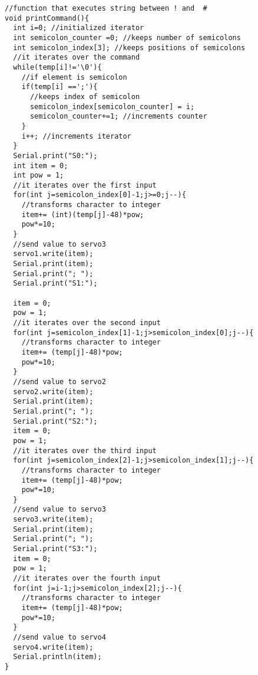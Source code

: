 \documentclass[pdftex,12pt,a4paper]{article}
\begin{document}
\begin{flushleft}
\begin{lstlisting}[language=Arduino]
//function that executes string between ! and  #
void printCommand(){
  int i=0; //initialized iterator
  int semicolon_counter =0; //keeps number of semicolons
  int semicolon_index[3]; //keeps positions of semicolons
  //it iterates over the command
  while(temp[i]!='\0'){
    //if element is semicolon
    if(temp[i] ==';'){
      //keeps index of semicolon
      semicolon_index[semicolon_counter] = i;
      semicolon_counter+=1; //increments counter
    }
    i++; //increments iterator
  }
  Serial.print("S0:");
  int item = 0; 
  int pow = 1;
  //it iterates over the first input
  for(int j=semicolon_index[0]-1;j>=0;j--){
    //transforms character to integer
    item+= (int)(temp[j]-48)*pow;
    pow*=10;
  }
  //send value to servo3
  servo1.write(item);
  Serial.print(item);
  Serial.print("; ");
  Serial.print("S1:");

  item = 0; 
  pow = 1;
  //it iterates over the second input
  for(int j=semicolon_index[1]-1;j>semicolon_index[0];j--){
    //transforms character to integer
    item+= (temp[j]-48)*pow;
    pow*=10;
  }
  //send value to servo2
  servo2.write(item);
  Serial.print(item);
  Serial.print("; ");
  Serial.print("S2:");
  item = 0; 
  pow = 1;
  //it iterates over the third input
  for(int j=semicolon_index[2]-1;j>semicolon_index[1];j--){
    //transforms character to integer
    item+= (temp[j]-48)*pow;
    pow*=10;
  }
  //send value to servo3
  servo3.write(item);
  Serial.print(item);
  Serial.print("; ");
  Serial.print("S3:");
  item = 0; 
  pow = 1;
  //it iterates over the fourth input
  for(int j=i-1;j>semicolon_index[2];j--){
    //transforms character to integer
    item+= (temp[j]-48)*pow;
    pow*=10;
  }
  //send value to servo4
  servo4.write(item);
  Serial.println(item);
}


\end{lstlisting}
\end{flushleft}
\end{document}
